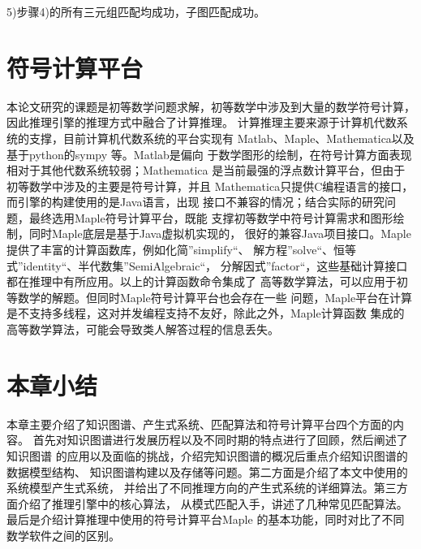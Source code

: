\documentclass{standalone}
\begin{document}
5)步骤4)的所有三元组匹配均成功，子图匹配成功。

\section{符号计算平台}
本论文研究的课题是初等数学问题求解，初等数学中涉及到大量的数学符号计算，
因此推理引擎的推理方式中融合了计算推理。
计算推理主要来源于计算机代数系统的支撑，目前计算机代数系统的平台实现有
Matlab、Maple、Mathematica以及基于python的sympy 等。Matlab是偏向
于数学图形的绘制，在符号计算方面表现相对于其他代数系统较弱；Mathematica
是当前最强的浮点数计算平台，但由于初等数学中涉及的主要是符号计算，并且
Mathematica只提供C编程语言的接口，而引擎的构建使用的是Java语言，出现
接口不兼容的情况；结合实际的研究问题，最终选用Maple符号计算平台，既能
支撑初等数学中符号计算需求和图形绘制，同时Maple底层是基于Java虚拟机实现的，
很好的兼容Java项目接口。Maple提供了丰富的计算函数库，例如化简”simplify“、
解方程”solve“、恒等式”identity“、半代数集”SemiAlgebraic“，
分解因式”factor“，这些基础计算接口都在推理中有所应用。以上的计算函数命令集成了
高等数学算法，可以应用于初等数学的解题。但同时Maple符号计算平台也会存在一些
问题，Maple平台在计算是不支持多线程，这对并发编程支持不友好，除此之外，Maple计算函数
集成的高等数学算法，可能会导致类人解答过程的信息丢失。
\section{本章小结}
本章主要介绍了知识图谱、产生式系统、匹配算法和符号计算平台四个方面的内容。
首先对知识图谱进行发展历程以及不同时期的特点进行了回顾，然后阐述了知识图谱
的应用以及面临的挑战，介绍完知识图谱的概况后重点介绍知识图谱的数据模型结构、
知识图谱构建以及存储等问题。第二方面是介绍了本文中使用的系统模型产生式系统，
并给出了不同推理方向的产生式系统的详细算法。第三方面介绍了推理引擎中的核心算法，
从模式匹配入手，讲述了几种常见匹配算法。最后是介绍计算推理中使用的符号计算平台Maple
的基本功能，同时对比了不同数学软件之间的区别。
\end{document}
